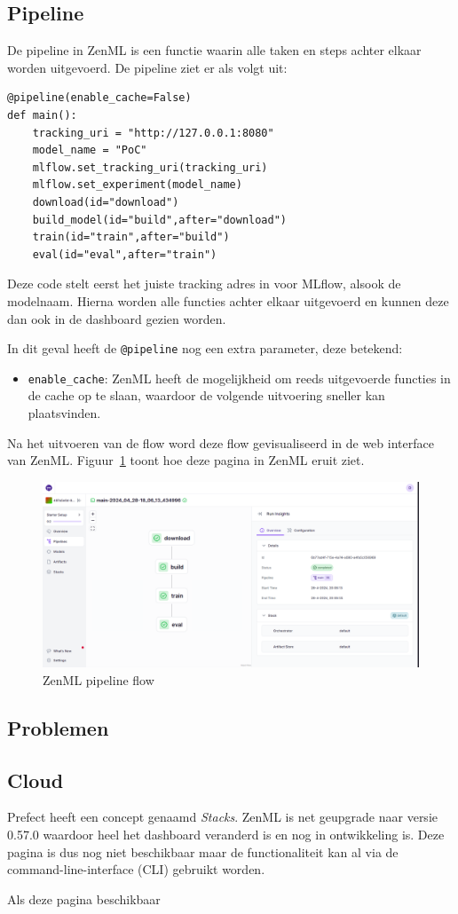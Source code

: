 \subsection{Pipeline}
De pipeline in ZenML is een functie waarin alle taken en steps achter elkaar worden uitgevoerd. De pipeline ziet er als volgt uit:
\begin{verbatim}
@pipeline(enable_cache=False)
def main():
    tracking_uri = "http://127.0.0.1:8080"
    model_name = "PoC"
    mlflow.set_tracking_uri(tracking_uri)
    mlflow.set_experiment(model_name)
    download(id="download")
    build_model(id="build",after="download")
    train(id="train",after="build")
    eval(id="eval",after="train")
\end{verbatim}
Deze code stelt eerst het juiste tracking adres in voor MLflow, alsook de modelnaam. Hierna worden alle functies achter elkaar uitgevoerd en kunnen deze dan ook in de dashboard gezien worden.

In dit geval heeft de \texttt{@pipeline} nog een extra parameter, deze betekend:

\begin{itemize}
    \item \texttt{enable\_cache}: ZenML heeft de mogelijkheid om reeds uitgevoerde functies in de cache op te slaan, waardoor de volgende uitvoering sneller kan plaatsvinden.
\end{itemize}

Na het uitvoeren van de flow word deze flow gevisualiseerd in de web interface van ZenML. Figuur~\ref{fig:ZenML_Pipeline_Flow} toont hoe deze pagina in ZenML eruit ziet.
\begin{figure}
    \centering
    \includegraphics[width=0.9\linewidth]{graphics/ZenML_Pipeline_Flow.PNG}
    \caption{ZenML pipeline flow}
    \label{fig:ZenML_Pipeline_Flow}
\end{figure}
\subsection{Problemen}

\subsection{Cloud}
Prefect heeft een concept genaamd \textit{Stacks}. ZenML is net geupgrade naar versie 0.57.0 waardoor heel het dashboard veranderd is en nog in ontwikkeling is.
Deze pagina is dus nog niet beschikbaar maar de functionaliteit kan al via de command-line-interface (CLI) gebruikt worden.

Als deze pagina beschikbaar

